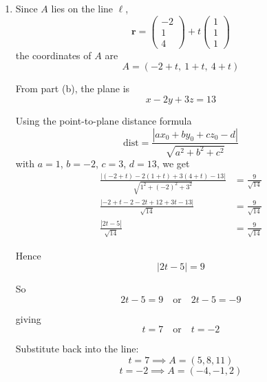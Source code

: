 \documentclass[leqno]{article}
\begin{document}
\begin{enumerate}[
  label=\textbf{\arabic*.},
  leftmargin=*,
  topsep=0pt,
  partopsep=0pt,
  parsep=0pt
]
\begin{tcolorbox}[colback=white, colframe=scarlet, title={\textbf{Solution}}, breakable, grow to left by=6mm, grow to right by=10mm]
\begin{enumerate}[label=\textbf{(\alph*)}]
  So
  \begin{align*}
  \begin{pmatrix}1\\-2\\3\end{pmatrix}\cdot \begin{pmatrix}x-2\\y+1\\z-3\end{pmatrix} &= 0\\
  (x-2)-2(y+1)+3(z-3) &= 0\\
  x-2-2y-2+3z-9 &= 0\\
  x-2y+3z-13 &= 0
  \end{align*}
  
  Therefore a Cartesian equation of \(\Pi\) is
  \[
  x-2y+3z-13=0
  \]

  \item Since \(A\) lies on the line \(\ell\),
  \[
  \mathbf r=\begin{pmatrix}-2\\1\\4\end{pmatrix}+t\begin{pmatrix}1\\1\\1\end{pmatrix}
  \]
  the coordinates of \(A\) are
  \[
  A=(-2+t,\ 1+t,\ 4+t)
  \]
  
  From part (b), the plane is
  \[
  x-2y+3z=13
  \]
  
  Using the point-to-plane distance formula
  \[
  \mathrm{dist}
  =\frac{\left\lvert ax_0+by_0+cz_0-d\right\rvert}{\sqrt{a^2+b^2+c^2}}
  \]
  with \(a=1\), \(b=-2\), \(c=3\), \(d=13\), we get
  \begin{align*}
  \frac{\left\lvert (-2+t)-2(1+t)+3(4+t)-13\right\rvert}{\sqrt{1^2+(-2)^2+3^2}} &= \frac{9}{\sqrt{14}}\\
  \frac{\left\lvert -2+t-2-2t+12+3t-13\right\rvert}{\sqrt{14}} &= \frac{9}{\sqrt{14}}\\
  \frac{\left\lvert 2t-5\right\rvert}{\sqrt{14}} &= \frac{9}{\sqrt{14}}
  \end{align*}
  
  Hence
  \[
  |2t-5|=9
  \]
  
  So
  \[
  2t-5=9 \quad \text{or} \quad 2t-5=-9
  \]
  
  giving
  \[
  t=7 \quad \text{or} \quad t=-2
  \]
  
  Substitute back into the line:
  \[
  t=7 \implies A=(5,8,11)
  \]
  \[
  t=-2 \implies A=(-4,-1,2)
  \]
  

\end{enumerate}
\end{tcolorbox}
\end{enumerate}
\end{document}
